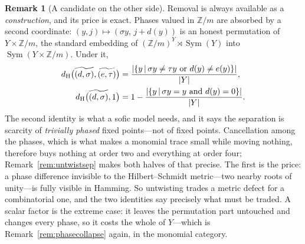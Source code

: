 \documentclass[11pt]{amsart}
\theoremstyle{definition}
\newtheorem{remark}[theorem]{Remark}
\theoremstyle{plain}
\newcommand{\Z}{\mathbb Z}
\newcommand{\Sym}{\operatorname{Sym}}
\newcommand{\distH}{d_{\mathrm H}}
\DeclarePairedDelimiter{\abs}{\lvert}{\rvert}
\newcommand{\set}[1]{\left\{#1\right\}}
\newcommand{\suchthat}{\,\middle|\,}
\begin{document}
\begin{remark}[A candidate on the other side]
Removal is always available as a \emph{construction}, and its price is exact.  Phases valued in \(\Z/m\) are absorbed by a second coordinate: \((y,j)\mapsto(\sigma y,\,j+d(y))\) is an honest permutation of \(Y\times\Z/m\), the standard embedding of \((\Z/m)^Y\rtimes\Sym(Y)\) into \(\Sym(Y\times\Z/m)\).  Under it,
\begin{align*}
 \distH\bigl(\widetilde{(d,\sigma)},\widetilde{(e,\tau)}\bigr)
 &=\frac{\abs{\set{y\suchthat\sigma y\ne\tau y\ \text{or}\ d(y)\ne e(y)}}}{\abs Y},\\
 \distH\bigl(\widetilde{(d,\sigma)},1\bigr)
 &=1-\frac{\abs{\set{y\suchthat\sigma y=y\ \text{and}\ d(y)=0}}}{\abs Y}.
\end{align*}
The second identity is what a sofic model needs, and it says the separation is scarcity of \emph{trivially phased} fixed points---not of fixed points.  Cancellation among the phases, which is what makes a monomial trace small while moving nothing, therefore buys nothing at order two and everything at order four; Remark~\ref{rem:untwistsep} makes both halves of that precise.  The first is the price: a phase difference invisible to the Hilbert--Schmidt metric---two nearby roots of unity---is fully visible in Hamming.  So untwisting trades a metric defect for a combinatorial one, and the two identities say precisely what must be traded.  A scalar factor is the extreme case: it leaves the permutation part untouched and changes every phase, so it costs the whole of \(Y\)---which is Remark~\ref{rem:phasecollapse} again, in the monomial category.
\end{remark}
\end{document}
